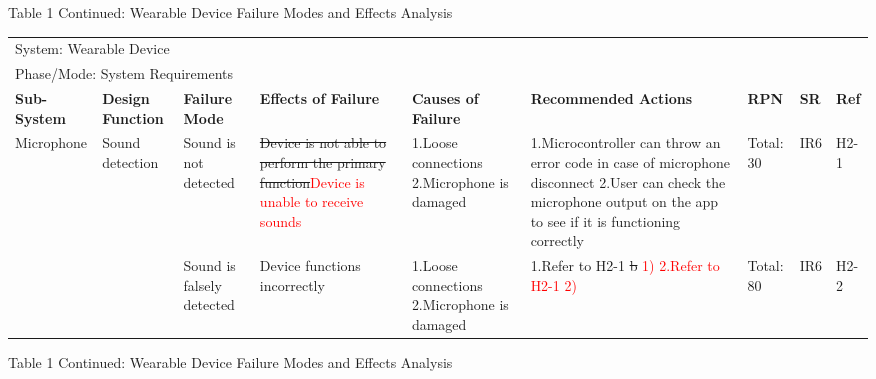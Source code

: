 \documentclass[12pt, titlepage]{article}
\begin{document}
\begin{landscape}
\begin{table}[H]
\begin{tabular}{| p{} | p{}  | p{} | p{} | p{} | p{} | p{} | p{} | p{} |}
 
        \end{tabular}

\end{table}
\begin{table}[H]
    \centering
        Table 1 Continued: Wearable Device Failure Modes and Effects Analysis

        \begin{tabular}{| p{} | p{}  | p{} | p{} | p{} | p{} | p{} | p{} | p{} |}
        \hline
        
        \multicolumn{9}{|l|}{System: Wearable Device} \\
        \multicolumn{9}{|l|}{Phase/Mode: System Requirements} \\ \hline
        \textbf{Sub-System} & \textbf{Design Function} & \textbf{Failure Mode} & \textbf{Effects of Failure} & \textbf{Causes of Failure} & \textbf{Recommended Actions} & \textbf{RPN} & \textbf{SR} & \textbf{Ref} \\ \hline
    
        Microphone & Sound detection & Sound is not detected & \sout{Device is not able to perform the primary function}\textcolor{red}{Device is unable to receive sounds}  & 1.Loose connections \newline 2.Microphone is damaged  & 1.Microcontroller can throw an error code in case of microphone disconnect \newline 2.User can check the microphone output on the app to see if it is functioning correctly & Total: 30  & IR6  & H2-1 \\ \cline{3-9}
    
         & & Sound is falsely detected & Device functions incorrectly & 1.Loose connections \newline 2.Microphone is damaged & 1.Refer to H2-1 \sout{b} \textcolor{red}{1)} \newline \textcolor{red}{2.Refer to H2-1 2)} & Total: 80 & IR6 & H2-2 \\ \hline
     
        \end{tabular}

\end{table}
\begin{table}[H]
    \centering
        Table 1 Continued: Wearable Device Failure Modes and Effects Analysis
        \begin{tabular}{| p{} | p{}  | p{} | p{} | p{} | p{} | p{} | p{} | p{} |}
            \hline
        

\end{tabular}
\end{table}
\end{landscape}
\end{document}
